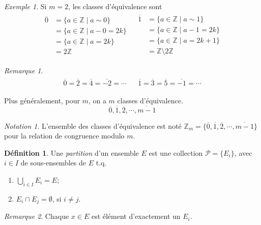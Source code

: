 \documentclass{report}
\newcommand*{\entiers}{\mathbb{Z}}
\theoremstyle{definition}
\newtheorem*{defin}{D\'efinition}
\theoremstyle{remark}
\newtheorem*{exem}{Exemple}
\newtheorem*{nota}{Notation}
\newtheorem*{rema}{Remarque}
\begin{document}
\begin{exem}
		Si $m=2$, les classes d'\'equivalence sont
		\begin{align*}
			\begin{split}
				\overline{0}&= \{a \in \entiers \mid a \sim 0\}\\
				&= \{a \in \entiers \mid a-0=2k\}\\
				&= \{a \in \entiers \mid a=2k\}\\
				&= 2\entiers
			\end{split}
			&
			\begin{split}
				\overline{1}&= \{a \in \entiers \mid a \sim 1\}\\
				&= \{a \in \entiers \mid a-1=2k\}\\
				&= \{a \in \entiers \mid a=2k+1\}\\
				&= \entiers\setminus2\entiers
			\end{split}
		\end{align*}
		\begin{rema}
			\begin{align*}
				\begin{split}
					\overline{0} = \overline{2} = \overline{4} = \overline{-2} = \dotsb
				\end{split}
				&
				\begin{split}
					\overline{1} = \overline{3} = \overline{5} = \overline{-1} = \dotsb
				\end{split}
			\end{align*}
		\end{rema}

		Plus g\'en\'eralement, pour $m$, on a $m$ classes d'\'equivalence.
		\[
		\overline{0}, \overline1, \overline2, \dotsb, \overline{m-1}
		\]
		\begin{nota}
			L'ensemble des classes d'\'equivalence est not\'e $\entiers_m = \{\overline{0}, \overline1, \overline2, \dotsb, \overline{m-1}\}$ pour la relation de congruence modulo $m$.
		\end{nota}
	\end{exem}
	\begin{defin}
		Une \emph{partition} d'un ensemble $E$ est une collection $\mathcal{P} = \{E_i\}$, avec $i \in I$ de sous-ensembles de $E$ t.q.
		\begin{enumerate}[label=(\arabic*)]
			\item $\bigcup\limits_{i \in I} E_i = E$;
			\item $E_i \cap E_j = \emptyset$, si $i \neq j$.
		\end{enumerate}
		\begin{rema}
			Chaque $x \in E$ est \'el\'ement d'exactement un $E_i$.
		\end{rema}
	\end{defin}
\end{document}
